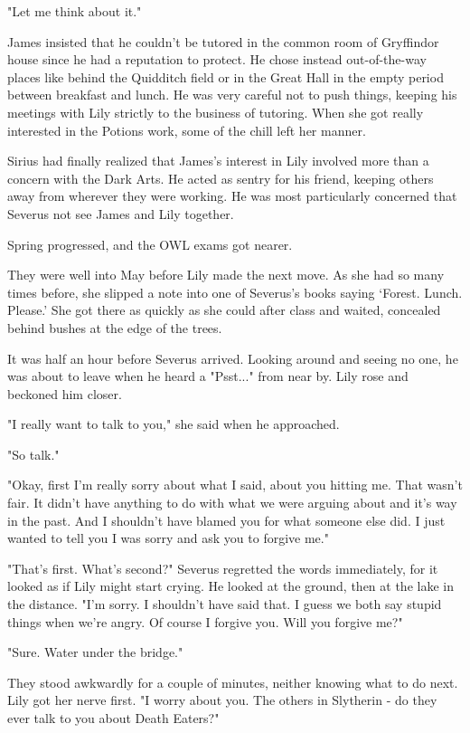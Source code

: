 \documentclass[a4paper,11pt]{article}
\begin{document}
"Let me think about it."

James insisted that he couldn't be tutored in the common room of Gryffindor house since he had a reputation to protect. He chose instead out-of-the-way places like behind the Quidditch field or in the Great Hall in the empty period between breakfast and lunch. He was very careful not to push things, keeping his meetings with Lily strictly to the business of tutoring. When she got really interested in the Potions work, some of the chill left her manner.

Sirius had finally realized that James's interest in Lily involved more than a concern with the Dark Arts. He acted as sentry for his friend, keeping others away from wherever they were working. He was most particularly concerned that Severus not see James and Lily together.

Spring progressed, and the OWL exams got nearer.

They were well into May before Lily made the next move. As she had so many times before, she slipped a note into one of Severus's books saying `Forest. Lunch. Please.' She got there as quickly as she could after class and waited, concealed behind bushes at the edge of the trees.

It was half an hour before Severus arrived. Looking around and seeing no one, he was about to leave when he heard a "Psst..." from near by. Lily rose and beckoned him closer.

"I really want to talk to you," she said when he approached.

"So talk."

"Okay, first I'm really sorry about what I said, about you hitting me. That wasn't fair. It didn't have anything to do with what we were arguing about and it's way in the past. And I shouldn't have blamed you for what someone else did. I just wanted to tell you I was sorry and ask you to forgive me."

"That's first. What's second?" Severus regretted the words immediately, for it looked as if Lily might start crying. He looked at the ground, then at the lake in the distance. "I'm sorry. I shouldn't have said that. I guess we both say stupid things when we're angry. Of course I forgive you. Will you forgive me?"

"Sure. Water under the bridge."

They stood awkwardly for a couple of minutes, neither knowing what to do next. Lily got her nerve first. "I worry about you. The others in Slytherin - do they ever talk to you about Death Eaters?"
\end{document}
